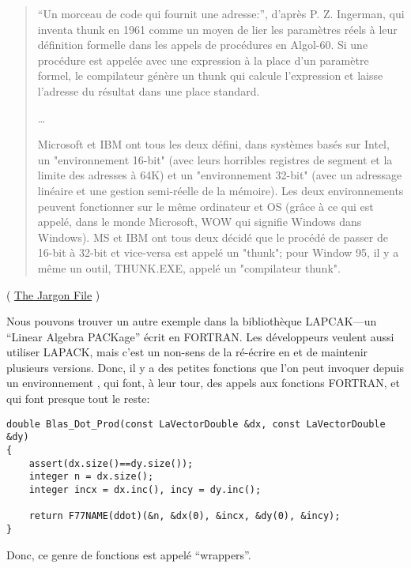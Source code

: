 \begin{framed}
\begin{quotation}
“Un morceau de code qui fournit une adresse:”, d'après P. Z. Ingerman, qui inventa
thunk en 1961 comme un moyen de lier les paramètres réels à leur définition
formelle dans les appels de procédures en Algol-60. Si une procédure est appelée
avec une expression à la place d'un paramètre formel, le compilateur génère un
thunk qui calcule l'expression et laisse l'adresse du résultat dans une place
standard.

\dots

Microsoft et IBM ont tous les deux défini, dans systèmes basés sur Intel, un
"environnement 16-bit" (avec leurs horribles registres de segment et la limite des
adresses à 64K) et un "environnement 32-bit" (avec un adressage linéaire et une
gestion semi-réelle de la mémoire). Les deux environnements peuvent fonctionner
sur le même ordinateur et OS (grâce à ce qui est appelé, dans le monde
Microsoft, WOW qui signifie Windows dans Windows). MS et IBM ont tous deux décidé
que le procédé de passer de 16-bit à 32-bit et vice-versa est appelé un "thunk";
pour Window 95, il y a même un outil, THUNK.EXE, appelé un "compilateur thunk".
\end{quotation}
\end{framed}
( \href{http://go.yurichev.com/17362}{The Jargon File} )

Nous pouvons trouver un autre exemple dans la bibliothèque LAPCAK---un ``Linear Algebra PACKage''
écrit en FORTRAN.
Les développeurs \CCpp veulent aussi utiliser LAPACK, mais c'est un non-sens de
la ré-écrire en \CCpp et de maintenir plusieurs versions.
Donc, il y a des petites fonctions que l'on peut invoquer depuis un environnement
\CCpp, qui font, à leur tour, des appels aux fonctions FORTRAN, et qui font
presque tout le reste:

\begin{lstlisting}[style=customc]
double Blas_Dot_Prod(const LaVectorDouble &dx, const LaVectorDouble &dy)
{
    assert(dx.size()==dy.size());
    integer n = dx.size();
    integer incx = dx.inc(), incy = dy.inc();

    return F77NAME(ddot)(&n, &dx(0), &incx, &dy(0), &incy);
}
\end{lstlisting}

Donc, ce genre de fonctions est appelé ``wrappers''.

